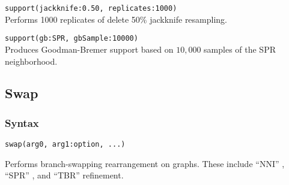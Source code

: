 		\begin{example}
			\item{\texttt{support(jackknife:0.50, replicates:1000)}\\Performs 1000 replicates of 
			delete 50\% jackknife resampling.}
				
			\item{\texttt{support(gb:SPR, gbSample:10000)}\\Produces Goodman-Bremer 
			support based on $10,000$ samples of 
						the SPR neighborhood.}
		\end{example}

\subsection{Swap} 
	\subsubsection{Syntax}
		\texttt{swap(arg0, arg1:option, ...)}
			
	\begin{phygdescription}
		{Performs branch-swapping rearrangement on graphs. These include ``NNI'' \citep{CaminandSokal1965, 
		Robinson1971}, ``SPR'' \citep{Dayhoff1969}, and ``TBR'' \citep{Farris1988, swofford1990a} refinement.}
	\end{phygdescription}
		
